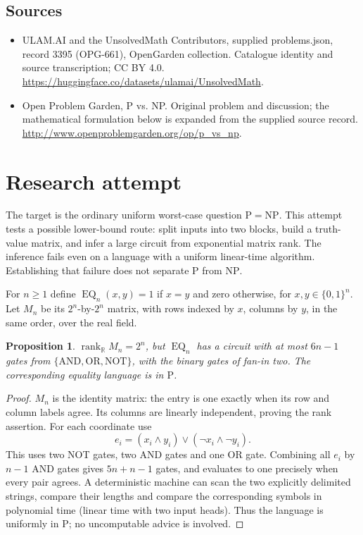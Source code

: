 \documentclass[11pt,a4paper]{article}
\newtheorem{proposition}{Proposition}
\begin{document}
\subsection{Sources}
\begin{itemize}
\item[S1] ULAM.AI and the UnsolvedMath Contributors, supplied problems.json, record 3395 (OPG-661), OpenGarden collection. Catalogue identity and source transcription; CC BY 4.0.
\url{https://huggingface.co/datasets/ulamai/UnsolvedMath}.
\item[S2] Open Problem Garden, P vs. NP. Original problem and discussion; the mathematical formulation below is expanded from the supplied source record.
\url{http://www.openproblemgarden.org/op/p_vs_np}.
\end{itemize}


\section{Research attempt}
The target is the ordinary uniform worst-case question $\mathrm P=\mathrm{NP}$. This attempt tests a possible lower-bound route: split inputs into two blocks, build a truth-value matrix, and infer a large circuit from exponential matrix rank. The inference fails even on a language with a uniform linear-time algorithm. Establishing that failure does not separate $\mathrm P$ from $\mathrm{NP}$.

For $n\ge1$ define $\operatorname{EQ}_n(x,y)=1$ if $x=y$ and zero otherwise, for $x,y\in\{0,1\}^n$. Let $M_n$ be its $2^n$-by-$2^n$ matrix, with rows indexed by $x$, columns by $y$, in the same order, over the real field.

\begin{proposition}
$\operatorname{rank}_{\mathbb R}M_n=2^n$, but $\operatorname{EQ}_n$ has a circuit with at most $6n-1$ gates from $\{\mathrm{AND},\mathrm{OR},\mathrm{NOT}\}$, with the binary gates of fan-in two. The corresponding equality language is in $\mathrm P$.
\end{proposition}
\begin{proof}
$M_n$ is the identity matrix: the entry is one exactly when its row and column labels agree. Its columns are linearly independent, proving the rank assertion. For each coordinate use
\[
 e_i=(x_i\wedge y_i)\vee(\neg x_i\wedge\neg y_i).
\]
This uses two NOT gates, two AND gates and one OR gate. Combining all $e_i$ by $n-1$ AND gates gives $5n+n-1$ gates, and evaluates to one precisely when every pair agrees. A deterministic machine can scan the two explicitly delimited strings, compare their lengths and compare the corresponding symbols in polynomial time (linear time with two input heads). Thus the language is uniformly in $\mathrm P$; no uncomputable advice is involved.
\end{proof}
\end{document}

